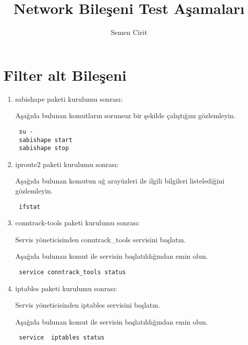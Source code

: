 \documentclass[a4paper,10pt]{article}
\title{Network Bileşeni Test Aşamaları}
\author{Semen Cirit}
\begin{document}
\maketitle
\section{Filter alt Bileşeni}
\begin{enumerate}
\item sabishape paketi kurulumu sonrası:

Aşağıda bulunan komutların sorunsuz bir şekilde çalıştığını gözlemleyin.
\begin{verbatim}
 su -
 sabishape start
 sabishape stop
\end{verbatim}

 \item iproute2 paketi kurulumu sonrası:

Aşağıda bulunan komutun ağ arayüzleri ile ilgili bilgileri listelediğini gözlemleyin. 
\begin{verbatim}
 ifstat
\end{verbatim}
\item conntrack-tools paketi kurulumu sonrası:

Servis yöneticisinden conntrack\_tools servisini başlatın.

Aşağıda bulunan komut ile servisin başlatıldığından emin olun.
\begin{verbatim}
 service conntrack_tools status
\end{verbatim}
\item iptables paketi kurulumu sonrası:

Servis yöneticisinden iptables servisini başlatın.

Aşağıda bulunan komut ile servisin başlatıldığından emin olun.
\begin{verbatim}
 service  iptables status
\end{verbatim}
\end{enumerate}
\end{document}
